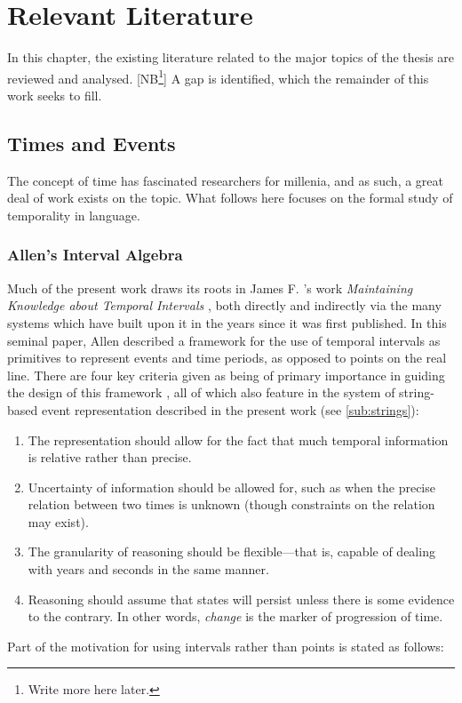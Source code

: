 \documentclass[a4paper,12pt,leqno]{article}
\newcommand{\nb}[1]{{\color{red}[NB\footnote{{\color{red}#1}}]}}
\begin{document}
\section{Relevant Literature}\label{sec:litreview}
In this chapter, the existing literature related to the major topics of the thesis are reviewed and analysed. \nb{Write more here later.} A gap is identified, which the remainder of this work seeks to fill.
\subsection{Times and Events}\label{sub:timesevents}
The concept of time has fascinated researchers for millenia, and as such, a great deal of work exists on the topic. What follows here focuses on the formal study of temporality in language.
\subsubsection{Allen's Interval Algebra}\label{ssub:allen}
Much of the present work draws its roots in James F. \citeauthor{allen1983maintaining}'s work \textit{Maintaining Knowledge about Temporal Intervals} \citeyearpar{allen1983maintaining}, both directly and indirectly via the many systems which have built upon it in the years since it was first published. In this seminal paper, Allen described a framework for the use of temporal intervals as primitives to represent events and time periods, as opposed to points on the real line. There are four key criteria given as being of primary importance in guiding the design of this framework \citeyearpar[p. 833]{allen1983maintaining}, all of which also feature in the system of string-based event representation described in the present work (see \cref{sub:strings}):
\begin{enumerate}\label{other:allen-motivations}
\onehalfspacing
\item The representation should allow for the fact that much temporal information is relative rather than precise.
\item Uncertainty of information should be allowed for, such as when the precise relation between two times is unknown (though constraints on the relation may exist).
\item The granularity of reasoning should be flexible---that is, capable of dealing with years and seconds in the same manner.
\item Reasoning should assume that states will persist unless there is some evidence to the contrary. In other words, \textit{change} is the marker of progression of time. 
\end{enumerate}
Part of the motivation for using intervals rather than points is stated as follows:
\end{document}
